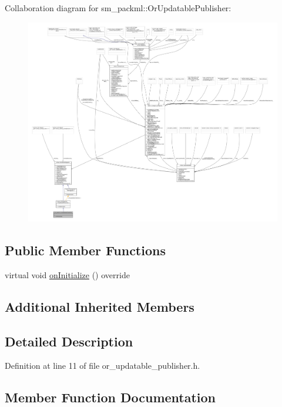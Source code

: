 Collaboration diagram for sm\+\_\+packml\+:\+:Or\+Updatable\+Publisher\+:
\nopagebreak
\begin{figure}[H]
\begin{center}
\leavevmode
\includegraphics[width=350pt]{classsm__packml_1_1OrUpdatablePublisher__coll__graph}
\end{center}
\end{figure}
\subsection*{Public Member Functions}
\begin{DoxyCompactItemize}
\item 
virtual void \hyperlink{classsm__packml_1_1OrUpdatablePublisher_a1689f8aac565881e3f65246b6d6ce6a2}{on\+Initialize} () override
\end{DoxyCompactItemize}
\subsection*{Additional Inherited Members}


\subsection{Detailed Description}


Definition at line 11 of file or\+\_\+updatable\+\_\+publisher.\+h.



\subsection{Member Function Documentation}
\mbox{\label{classsm__packml_1_1OrUpdatablePublisher_a1689f8aac565881e3f65246b6d6ce6a2}} 
